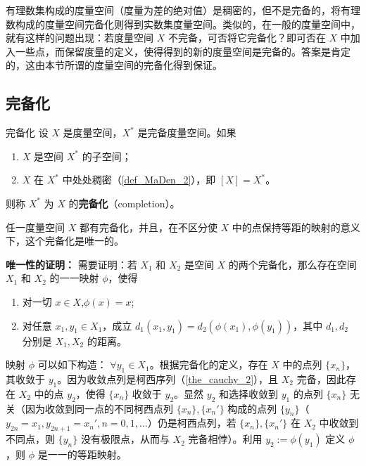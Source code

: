 有理数集构成的度量空间（度量为差的绝对值）是稠密的，但不是完备的，将有理数构成的度量空间完备化则得到实数集度量空间。类似的，在一般的度量空间中，就有这样的问题出现：若度量空间 $X$ 不完备，可否将它完备化？即可否在 $X$ 中加入一些点，而保留度量的定义，使得得到的新的度量空间是完备的。答案是肯定的，这由本节所谓的度量空间的完备化得到保证。

\subsection{完备化}
\begin{definition}{完备化}
设 $X$ 是度量空间，$X^*$ 是完备度量空间。如果
\begin{enumerate}
\item $X$ 是空间 $X^*$ 的子空间；
\item $X$ 在 $X^*$ 中处处稠密（\autoref{def_MaDen_2}），即 $[X]=X^*$。
\end{enumerate}
则称 $X^*$ 为 $X$ 的\textbf{完备化}（completion）。
\end{definition}

\begin{theorem}{}
任一度量空间 $X$ 都有完备化，并且，在不区分使 $X$ 中的点保持等距的映射的意义下，这个完备化是唯一的。
\end{theorem}

\textbf{唯一性的证明：}
需要证明：若 $X_1$ 和 $X_2$ 是空间 $X$ 的两个完备化，那么存在空间 $X_1$ 和 $X_2$ 的一一映射 $\phi$，使得
\begin{enumerate}
\item 对一切 $x\in X$,$\phi(x)=x$;
\item 对任意 $x_1,y_1\in X_1$，成立 $d_1(x_1,y_1)=d_2(\phi(x_1),\phi(y_1))$，其中 $d_1,d_2$ 分别是 $X_1,X_2$ 的距离。
\end{enumerate}
映射 $\phi$ 可以如下构造： $\forall y_1\in X_1$。根据完备化的定义，存在 $X$ 中的点列 $\{x_n\}$，其收敛于 $y_1$。因为收敛点列是柯西序列（\autoref{the_cauchy_2}），且 $X_2$ 完备，因此存在 $X_2$ 中的点 $y_2$，使得 $\{x_n\}$ 收敛于 $y_2$。显然 $y_2$ 和选择收敛到 $y_1$ 的点列 $\{x_n\}$ 无关（因为收敛到同一点的不同柯西点列 $\{x_n\},\{x_n'\}$ 构成的点列 $\{y_n\}$（$y_{2n}=x_1,y_{2n+1}=x_n',n=0,1,\ldots$）仍是柯西点列，若 $\{x_n\},\{x_n'\}$ 在 $X_2$ 中收敛到不同点，则 $\{y_n\}$ 没有极限点，从而与 $X_2$ 完备相悖）。利用 $y_2:=\phi(y_1)$ 定义 $\phi$，则 $\phi$ 是一一的等距映射。

